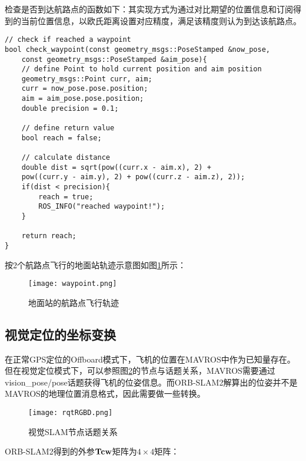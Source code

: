 检查是否到达航路点的函数如下：其实现方式为通过对比期望的位置信息和订阅得到的当前位置信息，以欧氏距离设置对应精度，满足该精度则认为到达该航路点。

\begin{verbatim}
// check if reached a waypoint
bool check_waypoint(const geometry_msgs::PoseStamped &now_pose, 
    const geometry_msgs::PoseStamped &aim_pose){
    // define Point to hold current position and aim position
    geometry_msgs::Point curr, aim;
    curr = now_pose.pose.position;
    aim = aim_pose.pose.position;
    double precision = 0.1;

    // define return value
    bool reach = false;

    // calculate distance
    double dist = sqrt(pow((curr.x - aim.x), 2) +
    pow((curr.y - aim.y), 2) + pow((curr.z - aim.z), 2));
    if(dist < precision){
        reach = true;
        ROS_INFO("reached waypoint!");
    }

    return reach;
}
\end{verbatim}

按2个航路点飞行的地面站轨迹示意图如图\ref{fig4-3}所示：

\begin{figure}[!ht]
	\centering
	\texttt{[image: waypoint.png]}
	\caption{地面站的航路点飞行轨迹}
	\label{fig4-3}
\end{figure}

\subsection{视觉定位的坐标变换} \label{4.2.3}

在正常GPS定位的Offboard模式下，飞机的位置在MAVROS中作为已知量存在。但在视觉定位模式下，可以参照图\ref{fig4-5}的节点与话题关系，MAVROS需要通过vision\_pose/pose话题获得飞机的位姿信息。而ORB-SLAM2解算出的位姿并不是MAVROS的地理位置消息格式，因此需要做一些转换。


\begin{figure}[!ht]
	\centering
	\texttt{[image: rqtRGBD.png]}
	\caption{视觉SLAM节点话题关系}
	\label{fig4-5}
\end{figure}

ORB-SLAM2得到的外参$\bf{Tcw}$矩阵为$4 \times 4$矩阵：


